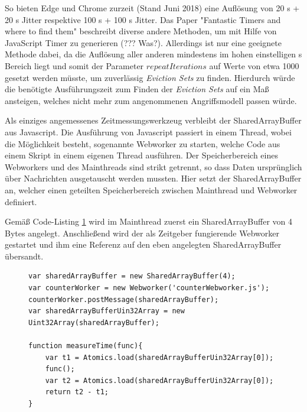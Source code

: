 So bieten Edge und Chrome zurzeit (Stand Juni 2018) eine Auflösung von 20 \textmu s + 20 \textmu s Jitter respektive 100 \textmu s + 100 \textmu s Jitter.
Das Paper "Fantastic Timers and where to find them" \cite{FantasticTimers} beschreibt diverse andere Methoden, um mit Hilfe von JavaScript Timer zu generieren (??? Was?). 
Allerdings ist nur eine geeignete Methode dabei, da die Auflösung aller anderen mindestens im hohen einstelligen \textmu s Bereich liegt und somit der Parameter $repeatIterations$ auf Werte von etwa 1000 gesetzt werden müsste, um zuverlässig \textit{Eviction Sets} zu finden. 
Hierdurch würde die benötigte Ausführungszeit zum Finden der \textit{Eviction Sets} auf ein Maß ansteigen, welches nicht mehr zum angenommenen Angriffsmodell passen würde.

\newtext

Als einziges angemessenes Zeitmessungswerkzeug verbleibt der SharedArrayBuffer aus Javascript. 
Die Ausführung von Javascript passiert in einem Thread, wobei die Möglichkeit besteht, sogenannte Webworker zu starten, welche Code aus einem Skript in einem eigenen Thread ausführen.
Der Speicherbereich eines Webworkers und des Mainthreads sind strikt getrennt, so dass Daten ursprünglich über Nachrichten ausgetauscht werden mussten. Hier setzt der SharedArrayBuffer an, welcher einen geteilten Speicherbereich zwischen Mainthread und Webworker definiert.

Gemäß Code-Listing \ref{alg_list:sharedArrayBufferWorkerMain} wird im Mainthread zuerst ein SharedArrayBuffer von 4 Bytes angelegt. Anschließend wird der als Zeitgeber fungierende Webworker gestartet und ihm eine Referenz auf den eben angelegten SharedArrayBuffer übersandt. 

\begin{figure}[h]
\label{alg_list:sharedArrayBufferWorkerMain}
\begin{lstlisting}[caption=main.js: Code welcher den counterWorker für Zeitmessungen verwendet]
var sharedArrayBuffer = new SharedArrayBuffer(4);
var counterWorker = new Webworker('counterWebworker.js');
counterWorker.postMessage(sharedArrayBuffer);
var sharedArrayBufferUin32Array = new Uint32Array(sharedArrayBuffer);

function measureTime(func){
    var t1 = Atomics.load(sharedArrayBufferUin32Array[0]);
    func();
    var t2 = Atomics.load(sharedArrayBufferUin32Array[0]);
    return t2 - t1;
}
\end{lstlisting}
\end{figure}

